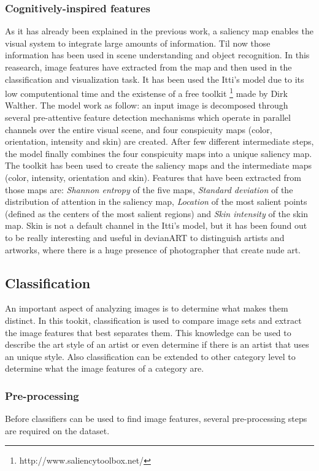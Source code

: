 \subsubsection{Cognitively-inspired features}
As it has already been explained in the previous work, a saliency map enables the visual system to integrate large amounts of information. Til now those information has been used in scene understanding and object recognition. In this reasearch, image features have extracted from the map and then used in the classification and visualization task.  
It has been used the Itti's model \cite{Itti_model} due to its low computentional time and the existense of a free toolkit \footnote{http://www.saliencytoolbox.net/} made by Dirk Walther.
The model work as follow: an input image is decomposed through several pre-attentive feature detection mechanisms which operate in parallel channels over the entire visual scene, and four conspicuity maps (color, orientation, intensity and skin) are created. After few different intermediate steps, the model finally combines the four conspicuity maps into a unique saliency map. 
The toolkit has been used to create the saliency maps and the intermediate maps (color, intensity, orientation and skin). Features that have been extracted from those maps are: \textit{Shannon entropy} of the five maps, \textit{Standard deviation} of the distribution of attention in the saliency map, \textit{Location} of the most salient points (defined as the centers of the most salient regions) and \textit{Skin intensity} of the skin map. Skin is not a default channel in the Itti's model, but it has been found out to be really interesting and useful in devianART to distinguish artists and artworks, where there is a huge presence of photographer that create nude art. 

\subsection{Classification}
An important aspect of analyzing images is to determine what makes them distinct.
In this tookit, classification is used to compare image sets and extract the image features that best separates them.
This knowledge can be used to describe the art style of an artist or even determine if there is an artist that uses an unique style.
Also classification can be extended to other category level to determine what the image features of a category are.

\subsubsection{Pre-processing}
Before classifiers can be used to find image features, several pre-processing steps are required on the dataset.

